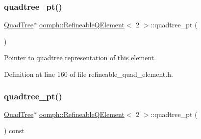 \mbox{\label{classoomph_1_1RefineableQElement_3_012_01_4_a7402a8119195f3684559ae200db41bb6}} 
\subsubsection{\texorpdfstring{quadtree\+\_\+pt()}{quadtree\_pt()}\hspace{0.1cm}{\footnotesize\ttfamily [1/2]}}
{\footnotesize\ttfamily \hyperlink{classoomph_1_1QuadTree}{Quad\+Tree}$\ast$ \hyperlink{classoomph_1_1RefineableQElement}{oomph\+::\+Refineable\+Q\+Element}$<$ 2 $>$\+::quadtree\+\_\+pt (\begin{DoxyParamCaption}{ }\end{DoxyParamCaption})\hspace{0.3cm}{\ttfamily [inline]}}



Pointer to quadtree representation of this element. 



Definition at line 160 of file refineable\+\_\+quad\+\_\+element.\+h.

\mbox{\label{classoomph_1_1RefineableQElement_3_012_01_4_a0a55f85fb8d6696a58bd4b54cd091d50}} 
\subsubsection{\texorpdfstring{quadtree\+\_\+pt()}{quadtree\_pt()}\hspace{0.1cm}{\footnotesize\ttfamily [2/2]}}
{\footnotesize\ttfamily \hyperlink{classoomph_1_1QuadTree}{Quad\+Tree}$\ast$ \hyperlink{classoomph_1_1RefineableQElement}{oomph\+::\+Refineable\+Q\+Element}$<$ 2 $>$\+::quadtree\+\_\+pt (\begin{DoxyParamCaption}{ }\end{DoxyParamCaption}) const\hspace{0.3cm}{\ttfamily [inline]}}



